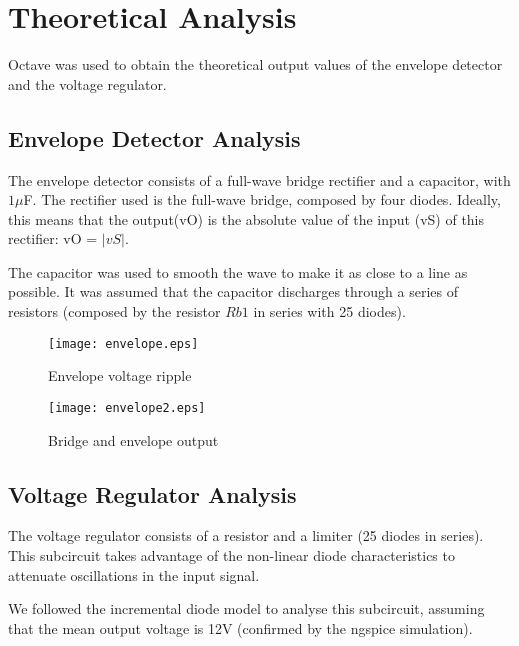 \section{Theoretical Analysis} \label{sec:analysis}


Octave was used to obtain the theoretical output values of the envelope detector and the voltage regulator. 



\subsection{Envelope Detector Analysis}

The envelope detector consists of a full-wave bridge rectifier and a capacitor, with $1\mu$F.
The rectifier used is the full-wave bridge, composed by four diodes. Ideally, this means that the output(vO) is the absolute value of the input (vS) of this rectifier: vO = $|vS|$.

The capacitor was used to smooth the wave to make it as close to a line as possible. It was assumed that the capacitor discharges through a series of resistors (composed by the resistor $Rb1$ in series with 25 diodes).

\begin{figure}[h] \centering
  \begin{minipage}{.5\textwidth}
    \texttt{[image: envelope.eps]}
    \caption{Envelope voltage ripple}
    \label{fig:simenv}
    \end{minipage}%
  \begin{minipage}{.5\textwidth}
  \centering
    \texttt{[image: envelope2.eps]}
    \caption{Bridge and envelope output}
    \label{fig:compenv}
      \end{minipage}%
\end{figure}




\subsection{Voltage Regulator Analysis}

The voltage regulator consists of a resistor and a limiter (25 diodes in series). This subcircuit takes advantage of the non-linear diode characteristics to attenuate oscillations in the input signal.

We followed the incremental diode model to analyse this subcircuit, assuming that the mean output voltage is 12V (confirmed by the ngspice simulation).


